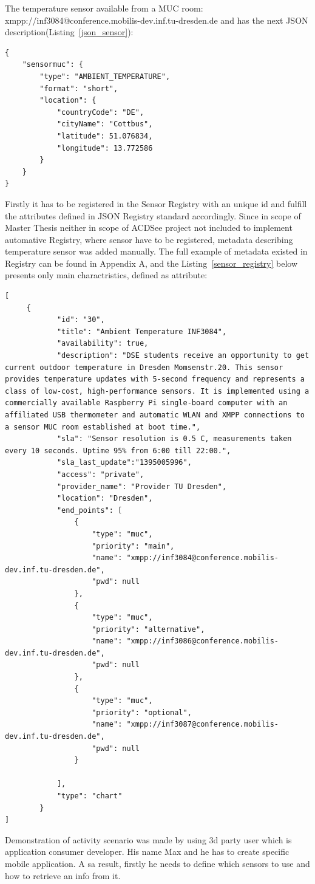 The temperature sensor available from a MUC room: xmpp://inf3084@conference.mobilis-dev.inf.tu-dresden.de and has the next JSON description(Listing~\ref{json_sensor}):
	\begin{lstlisting}[label=json_sensor,caption=JSON Description Format]
{
    "sensormuc": {
        "type": "AMBIENT_TEMPERATURE",
        "format": "short",
        "location": {
            "countryCode": "DE",
            "cityName": "Cottbus",
            "latitude": 51.076834,
            "longitude": 13.772586
        }
    }
}
	\end{lstlisting}
Firstly it has to be registered in the Sensor Registry with an unique id and fulfill the attributes defined in JSON Registry standard accordingly. Since in scope of Master Thesis neither in scope of ACDSee project not included to implement automative Registry, where sensor have to be registered, metadata describing temperature sensor was added manually. The full example of metadata existed in Registry can be found in Appendix A, and the Listing~\ref{sensor_registry} below presents only main charactristics, defined as attribute:
	\begin{lstlisting}[label=sensor_registry,caption=JSON Description Format]
	[
     {
            "id": "30",
            "title": "Ambient Temperature INF3084",
            "availability": true,
            "description": "DSE students receive an opportunity to get current outdoor temperature in Dresden Momsenstr.20. This sensor provides temperature updates with 5-second frequency and represents a class of low-cost, high-performance sensors. It is implemented using a commercially available Raspberry Pi single-board computer with an affiliated USB thermometer and automatic WLAN and XMPP connections to a sensor MUC room established at boot time.",
            "sla": "Sensor resolution is 0.5 C, measurements taken every 10 seconds. Uptime 95% from 6:00 till 22:00.",
            "sla_last_update":"1395005996",
            "access": "private",
            "provider_name": "Provider TU Dresden",
            "location": "Dresden",
            "end_points": [
                {
                    "type": "muc",
                    "priority": "main",
                    "name": "xmpp://inf3084@conference.mobilis-dev.inf.tu-dresden.de",
                    "pwd": null
                },
                {
                    "type": "muc",
                    "priority": "alternative",
                    "name": "xmpp://inf3086@conference.mobilis-dev.inf.tu-dresden.de",
                    "pwd": null
                },
                {
                    "type": "muc",
                    "priority": "optional",
                    "name": "xmpp://inf3087@conference.mobilis-dev.inf.tu-dresden.de",
                    "pwd": null
                }

            ],
            "type": "chart"
        }
]
	\end{lstlisting}
Demonstration of activity scenario was made by using 3d party user which is application consumer developer. His name Max and he has to create specific mobile application. A sa result, firstly he needs to define which sensors to use and how to retrieve an info from it. 

